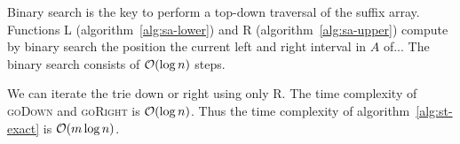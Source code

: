 Binary search is the key to perform a top-down traversal of the suffix array.
Functions \textsc{L} (algorithm~\ref{alg:sa-lower}) and \textsc{R} (algorithm~\ref{alg:sa-upper}) compute by binary search the position the current left and right interval in $A$ of...
The binary search consists of $\mathcal{O}(\log{n})$ steps.

\begin{algorithm}[h!]
\begin{minipage}[t]{.5\textwidth}
\label{alg:sa-lower}
\begin{algorithmic}[1]
		\Else
		\EndIf
	\EndWhile
\EndProcedure
\end{algorithmic}
\end{minipage}
\hfill
\begin{minipage}[t]{.5\textwidth}
\label{alg:sa-upper}
\begin{algorithmic}[1]
		\Else
		\EndIf
	\EndWhile
\EndProcedure
\end{algorithmic}
\end{minipage}
\end{algorithm}

We can iterate the trie down or right using only \textsc{R}.
The time complexity of \textsc{goDown} and \textsc{goRight} is $\mathcal{O}(\log{n})$.
Thus the time complexity of algorithm~\ref{alg:st-exact} is $\mathcal{O}(m \log{n})$.

